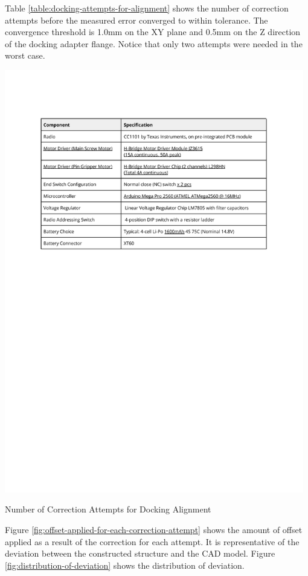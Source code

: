 Table \ref{table:docking-attempts-for-alignment} shows the number of correction attempts before the measured error converged to within tolerance. The convergence threshold is 1.0mm on the XY plane and 0.5mm on the Z direction of the docking adapter flange. Notice that only two attempts were needed in the worst case.

\begin{table}[!h]
    \includegraphics[page=4, trim=25.4mm 220mm 25.4mm 33mm, clip, width=0.98\textwidth]{tables/Tables in Chapter 7.pdf}
    \caption{Number of Correction Attempts for Docking Alignment}
    \label{table:docking-attempts-for-alignment}
\end{table}


Figure \ref{fig:offset-applied-for-each-correction-attempt} shows the amount of offset applied as a result of the correction for each attempt. It is representative of the deviation between the constructed structure and the CAD model. Figure \ref{fig:distribution-of-deviation} shows the distribution of deviation.

